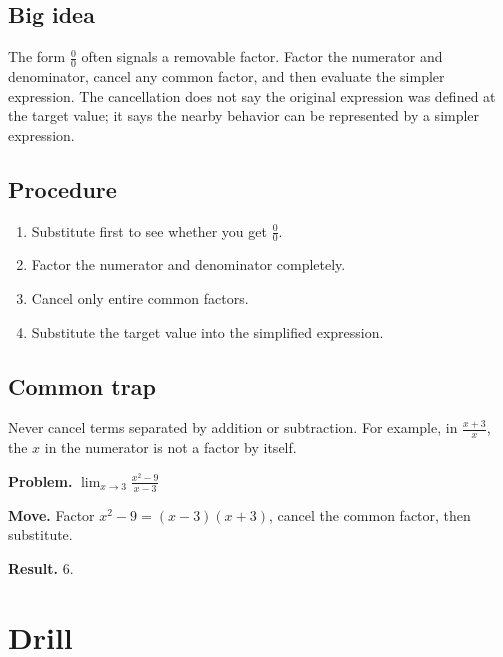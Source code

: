 \documentclass[11pt,oneside]{book}
\newenvironment{examplebox}[1]{\par\medskip\noindent{\color{steel}\bfseries #1}\par\noindent{\color{steel}\hrule}\smallskip}{\par\smallskip\noindent{\color{steel}\hrule}\par\medskip}
\begin{document}
\subsection*{Big idea}
The form $\frac{0}{0}$ often signals a removable factor. Factor the numerator and denominator, cancel any common factor, and then evaluate the simpler expression. The cancellation does not say the original expression was defined at the target value; it says the nearby behavior can be represented by a simpler expression.

\subsection*{Procedure}
\begin{enumerate}[leftmargin=*]
\item Substitute first to see whether you get $\frac{0}{0}$.
\item Factor the numerator and denominator completely.
\item Cancel only entire common factors.
\item Substitute the target value into the simplified expression.
\end{enumerate}

\subsection*{Common trap}
Never cancel terms separated by addition or subtraction. For example, in $\frac{x+3}{x}$, the $x$ in the numerator is not a factor by itself.
\begin{examplebox}{Worked example}
\textbf{Problem.} $\displaystyle \lim_{x\to 3}\frac{x^2-9}{x-3}$

\textbf{Move.} Factor $x^2-9=(x-3)(x+3)$, cancel the common factor, then substitute.

\textbf{Result.} $6$.
\end{examplebox}
\section*{Drill}
\end{document}
